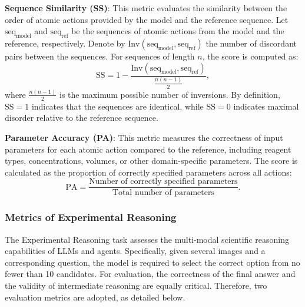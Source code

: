 \begin{tcolorbox}[
    breakable,
    title=Metric Definition of Sequence Similarity,
    colback=LighterGray,
    colframe=DeepPurple,
    colbacktitle=DeepPurple,
    coltitle=White
]
\textbf{Sequence Similarity (SS)}: This metric evaluates the similarity between the order of atomic actions provided by the model and the reference sequence. Let \(\text{seq}_\text{model}\) and \(\text{seq}_\text{ref}\) be the sequences of atomic actions from the model and the reference, respectively. Denote by \(\text{Inv}(\text{seq}_\text{model}, \text{seq}_\text{ref})\) the number of discordant pairs between the sequences. For sequences of length \(n\), the score is computed as:
\[
\text{SS} = 1 - \frac{\text{Inv}(\text{seq}_\text{model}, \text{seq}_\text{ref})}{\frac{n(n-1)}{2}},
\]
where \(\frac{n(n-1)}{2}\) is the maximum possible number of inversions. By definition, \(\text{SS} = 1\) indicates that the sequences are identical, while \(\text{SS} = 0\) indicates maximal disorder relative to the reference sequence.
\end{tcolorbox}


\begin{tcolorbox}[
    breakable,
    title=Metric Definition of Parameter Accuracy,
    colback=LighterGray,
    colframe=DeepPurple,
    colbacktitle=DeepPurple,
    coltitle=White
]
\textbf{Parameter Accuracy (PA)}: This metric measures the correctness of input parameters for each atomic action compared to the reference, including reagent types, concentrations, volumes, or other domain-specific parameters. The score is calculated as the proportion of correctly specified parameters across all actions:
\[
\text{PA} = \frac{\text{Number of correctly specified parameters}}{\text{Total number of parameters}}.
\]
\end{tcolorbox}



\subsubsection{Metrics of Experimental Reasoning}
The Experimental Reasoning task assesses the multi-modal scientific reasoning capabilities of LLMs and agents. 
Specifically, given several images and a corresponding question, the model is required to select the correct option from no fewer than 10 candidates. 
For evaluation, the correctness of the final answer and the validity of intermediate reasoning are equally critical. 
Therefore, two evaluation metrics are adopted, as detailed below.

